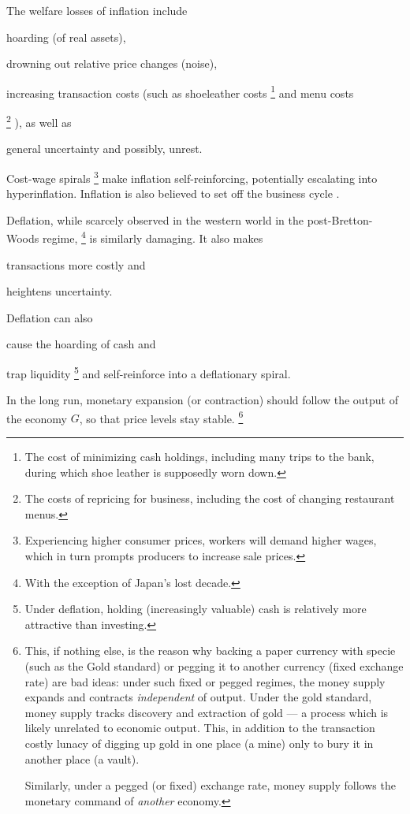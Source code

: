 The welfare losses of inflation include
\begin{inparaenum}
	\item hoarding (of real assets),

	\item drowning out relative price changes (noise),

	\item increasing transaction costs (such as shoeleather costs
	\footnote{
		The cost of minimizing cash holdings, including many trips to the bank, during which shoe leather is supposedly worn down.
	}
	and menu costs

	\footnote{
		The costs of repricing for business, including the cost of changing restaurant menus.
	}
	), as well as

	\item general uncertainty and possibly, unrest.
\end{inparaenum}
Cost-wage spirals
\footnote{
	Experiencing higher consumer prices, workers will demand higher wages, which in turn prompts producers to increase sale prices.
}
make inflation self-reinforcing, potentially escalating into hyperinflation.
Inflation is also believed to set off the business cycle \citep{Friedman1970}.

Deflation, while scarcely observed in the western world in the post-Bretton-Woods regime,
\footnote{
	With the exception of Japan's lost decade.
}
is similarly damaging.
It also makes
\begin{inparaenum}
	\item transactions more costly and

	\item heightens uncertainty.

	Deflation can also

	\item cause the hoarding of cash and

	\item trap liquidity
	\footnote{
		Under deflation, holding (increasingly valuable) cash is relatively more attractive than investing.
	}
	and self-reinforce into a deflationary spiral.
\end{inparaenum}

In the long run, monetary expansion (or contraction) should follow the output of the economy $G$, so that price levels stay stable.
\footnote{
	This, if nothing else, is the reason why backing a paper currency with specie (such as the Gold standard) or pegging it to another currency (fixed exchange rate) are bad ideas:
	under such fixed or pegged regimes, the money supply expands and contracts \emph{independent} of output.
	Under the gold standard, money supply tracks discovery and extraction of gold --- a process which is likely unrelated to economic output.
	This, in addition to the transaction costly lunacy of digging up gold in one place (a mine) only to bury it in another place (a vault).

	Similarly, under a pegged (or fixed) exchange rate, money supply follows the monetary command of \emph{another} economy.
}


